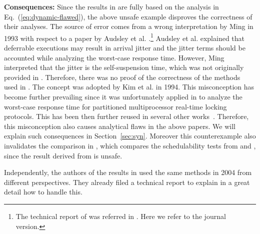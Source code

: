 
{\bf Consequences:} Since the results in \cite{ECRTS-AudsleyB04,RTAS-AudsleyB04,RTCSA-KimCPKH95,MingLiRTCSA1994} are fully based on the analysis in Eq.~(\ref{eq:dynamic-flawed}), the above unsafe example disproves the correctness of their analyses. The source of error comes from a wrong interpretation by Ming \cite{MingLiRTCSA1994} in 1993 with respect to a paper by Audsley et al. \cite{audsley-1993}.\footnote{The technical report of \cite{audsley-1993} was referred in \cite{MingLiRTCSA1994}. Here we refer to the journal version.} Audsley et al. \cite{audsley-1993} explained that deferrable executions may result in arrival jitter and the jitter terms should be accounted while analyzing the worst-case response time. However, Ming \cite{MingLiRTCSA1994} interpreted that the jitter is the self-suspension time, which was not originally provided in \cite{audsley-1993}. Therefore, there was no proof of the correctness of the methods used in \cite{MingLiRTCSA1994}. The concept was adopted by Kim et al. \cite{RTCSA-KimCPKH95} in 1994. This misconception has become further prevailing since it was unfortunately applied in \cite{lakshmanan-2009} to analyze the worst-case response time for
partitioned multiprocessor real-time locking protocols. This has been then further reused in several other works~\cite{zeng-2011,bbb-2013,yang-2013,kim-2014,han-2014,carminati-2014,yang-2014}. Therefore, this misconception also causes analytical flaws in the above papers. We will explain such consequences in Section~\ref{sec:syn}. 
Moreover this counterexample also invalidates the comparison in \cite{RidouardR06}, which compares the schedulability tests from \cite{RTCSA-KimCPKH95} and \cite[Page 164-165]{Liu:2000:RS:518501}, since the result derived from \cite{RTCSA-KimCPKH95} is unsafe.

Independently, the authors of the results in \cite{ECRTS-AudsleyB04,RTAS-AudsleyB04} used the same methods in 2004 from different perspectives. They already filed a technical report \cite{BletsasReport2015} to explain in a great detail how to handle this. 

